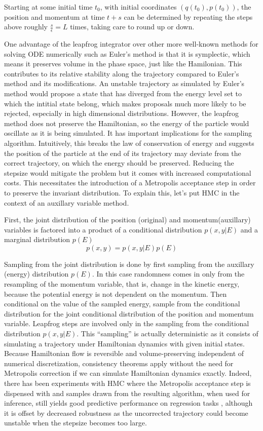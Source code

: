 \documentclass[]{report}
\begin{document}
Starting at some initial time $t_0$, with initial coordinates $(q(t_0),p(t_0))$, the position and momentum at time $t+s$ can be determined by repeating the steps above roughly $\frac{s}{\epsilon} = L$ times, taking care to round up or down. 

One advantage of the leapfrog integrator over other more well-known methods for
solving ODE numerically such as Euler's method is that it is symplectic, which
means it preserves volume in the phase space, just like the Hamilonian. This
contributes to its relative stability along the trajectory compared to Euler's
method and its modifications. An unstable trajectory as simulated by Euler's
method would propose a state that has diverged from the energy level set to
which the intitial state belong, which makes proposals much more likely to be
rejected, especially in high dimensional distributions.  However,
the leapfrog method does not preserve the Hamiltonian, so the energy of the particle would
oscillate as it is being simulated. It has important implications for the
sampling algorithm. Intuitively, this breaks the law of conservation of energy
and suggests the position of the particle at the end of its trajectory may
deviate from the correct trajectory, on which the energy should be preserved.
Reducing the stepsize would mitigate the problem but it comes with increased
computational costs. This necessitates the introduction of a Metropolis
acceptance step in order to preserve the invariant distribution. To explain
this, let's put HMC in the context of an auxillary variable method. 

First, the joint distribution of the position (original) and momentum(auxillary)
variables is factored into a product of a conditional distribution $p(x,y|E)$ and a
marginal distribution $p(E)$
\[ p(x,y) = p(x,y|E)p(E) \]

Sampling from the joint distribution is done by first sampling from the
auxillary (energy) distribution $p(E)$. In this case randomness comes in only from the
resampling of the momentum variable, that is, change in the kinetic energy,
because the potential energy is not dependent on the momentum. Then conditional on the value of the
sampled energy, sample from the conditional distribution for the joint
conditional distribution of the position and momentum variable. Leapfrog steps
are involved only in the sampling from the conditional distribution $p(x,y|E)$.
This ``sampling'' is actually deterministic as it consists of simulating a
trajectory under Hamiltonian dynamics with given initial states. Because
Hamiltonian flow is reversible and volume-preserving independent of numerical
discretization, consistency theorems apply without the need for Metropolis
correction if we can simulate Hamiltonian dynamics exactly. Indeed, there has
been experiments with HMC where the Metropolis acceptance step is dispensed with
and samples drawn from the resulting algorithm, when used for inference, still yields good predictive
performance on regression tasks \cite{neal1993bayesian}, although it is offset
by
decreased robustness as the uncorrected trajectory could become unstable when
the stepsize becomes too large. 
\end{document}
